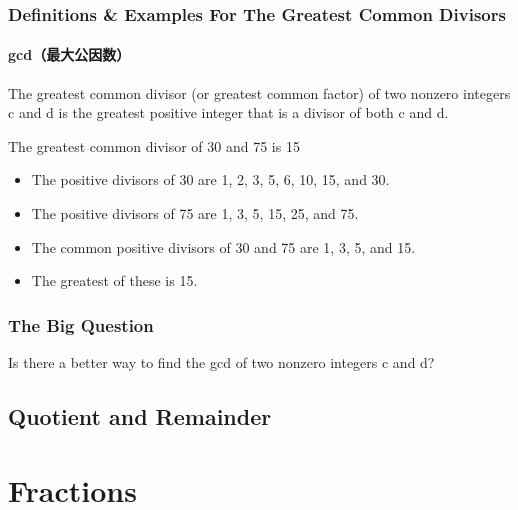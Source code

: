 \documentclass[
	11pt, %
]{beamer}
\begin{document}
\begin{frame}
	\frametitle{Definitions \& Examples For The Greatest Common Divisors}
	\framesubtitle{gcd（最大公因数）}
	
	\begin{definition}
	The greatest common divisor (or greatest common factor) of two
nonzero integers c and d is the greatest positive integer that is a divisor of
both c and d.
	\end{definition}
	
	\smallskip %
	
	\begin{example}
	The greatest common divisor of 30 and 75 is 15
		\begin{itemize}
			\item The positive divisors of 30 are 1, 2, 3, 5, 6, 10, 15, and 30.
			\item The positive divisors of 75 are 1, 3, 5, 15, 25, and 75.
			\item The common positive divisors of 30 and 75 are 1, 3, 5, and 15.
			\item The greatest of these is 15.
		\end{itemize}
	\end{example}
\end{frame}


\begin{frame}
	\frametitle{The Big Question}
	\bigskip
	{\LARGE Is there a better way to find the gcd of two nonzero integers c and d?}
	\bigskip
\end{frame}



\subsection{Quotient and Remainder}

\section{Fractions}

\end{document}
